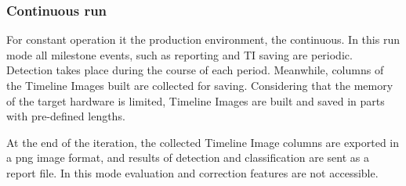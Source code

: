 \subsubsection{Continuous run}
For constant operation it the production environment, the continuous.
In this run mode all milestone events, such as reporting and TI saving are periodic. 
Detection takes place during the course of each period. 
Meanwhile, columns of the Timeline Images built are collected for saving.
Considering that the memory of the target hardware is limited, Timeline Images are built and saved in parts with pre-defined lengths.

At the end of the iteration, the collected Timeline Image columns are exported in a png image format, and results of detection and classification are sent as a report file.
In this mode evaluation and correction features are not accessible.


